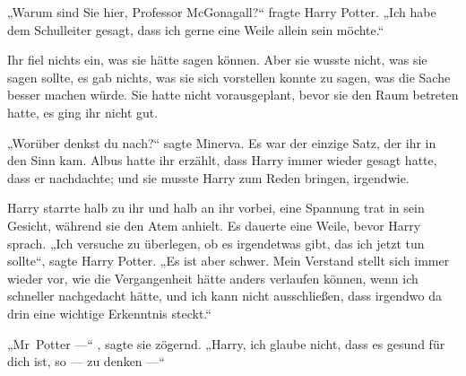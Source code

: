 „Warum sind Sie hier, Professor McGonagall?“ fragte Harry Potter.
„Ich habe dem Schulleiter gesagt, dass ich gerne eine Weile allein sein möchte.“

Ihr fiel nichts ein, was sie hätte sagen können. Aber sie wusste nicht, was sie sagen sollte, es gab nichts, was sie sich vorstellen konnte zu sagen, was die Sache besser machen würde. Sie hatte nicht vorausgeplant, bevor sie den Raum betreten hatte, es ging ihr nicht gut.

„Worüber denkst du nach?“ sagte Minerva.
Es war der einzige Satz, der ihr in den Sinn kam. Albus hatte ihr erzählt, dass Harry immer wieder gesagt hatte, dass er nachdachte; und sie musste Harry zum Reden bringen, irgendwie.



Harry starrte halb zu ihr und halb an ihr vorbei, eine Spannung trat in sein Gesicht, während sie den Atem anhielt. Es dauerte eine Weile, bevor Harry sprach.
„Ich versuche zu überlegen, ob es irgendetwas gibt, das ich jetzt tun sollte“, sagte Harry Potter.
„Es ist aber schwer. Mein Verstand stellt sich immer wieder vor, wie die Vergangenheit hätte anders verlaufen können, wenn ich schneller nachgedacht hätte, und ich kann nicht ausschließen, dass irgendwo da drin eine wichtige Erkenntnis steckt.“

„Mr~Potter —“ , sagte sie zögernd.
„Harry, ich glaube nicht, dass es gesund für dich ist, so — zu denken —“

